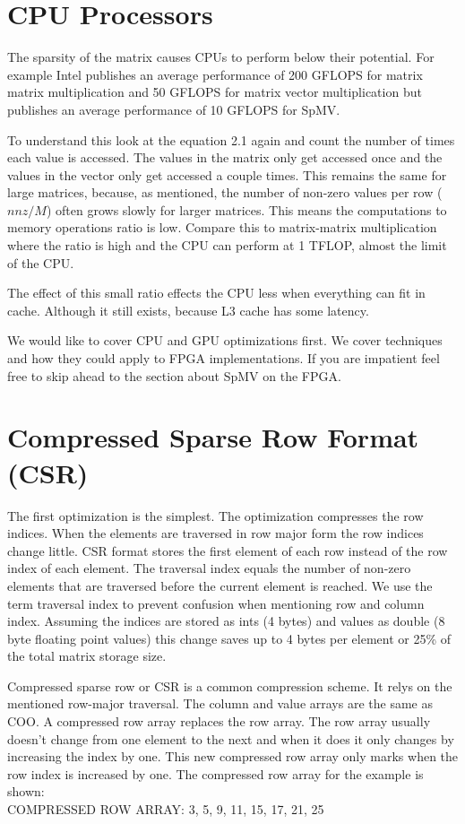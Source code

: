 \section{CPU Processors}
\par The sparsity of the matrix causes CPUs to perform below their potential. For example Intel publishes an average performance of 200 GFLOPS for matrix matrix multiplication and 50 GFLOPS for matrix vector multiplication but publishes an average performance of 10 GFLOPS for SpMV.
\par To understand this look at the equation 2.1 again and count the number of times each value is accessed. The values in the matrix only get accessed once and the values in the vector only get accessed a couple times. This remains the same for large matrices, because, as mentioned, the number of non-zero values per row ($nnz/M$) often grows slowly for larger matrices. This means the computations to memory operations ratio is low. Compare this to matrix-matrix multiplication where the ratio is high and the CPU can perform at 1 TFLOP, almost the limit of the CPU.
\par The effect of this small ratio effects the CPU less when everything can fit in cache. Although it still exists, because L3 cache has some latency.
\par We would like to cover CPU and GPU optimizations first. We cover techniques and how they could apply to FPGA implementations. If you are impatient feel free to skip ahead to the section about SpMV on the FPGA.
\section{Compressed Sparse Row Format (CSR)}
The first optimization is the simplest. The optimization compresses the row indices. When the elements are traversed in row major form the row indices change little. CSR format stores the first element of each row instead of the row index of each element. The traversal index equals the number of non-zero elements that are traversed before the current element is reached. We use the term traversal index to prevent confusion when mentioning row and column index. Assuming the indices are stored as ints (4 bytes) and values as double (8 byte floating point values) this change saves up to 4 bytes per element or 25\% of the total matrix storage size.
\par Compressed sparse row or CSR is a common compression scheme. It relys on the mentioned row-major traversal. The column and value arrays are the same as COO. A compressed row array replaces the row array. The row array usually doesn't change from one element to the next and when it does it only changes by increasing the index by one. This new compressed row array only marks when the row index is increased by one. The compressed row array for the example is shown: \\
COMPRESSED ROW ARRAY: 3, 5, 9, 11, 15, 17, 21, 25 \normalsize

